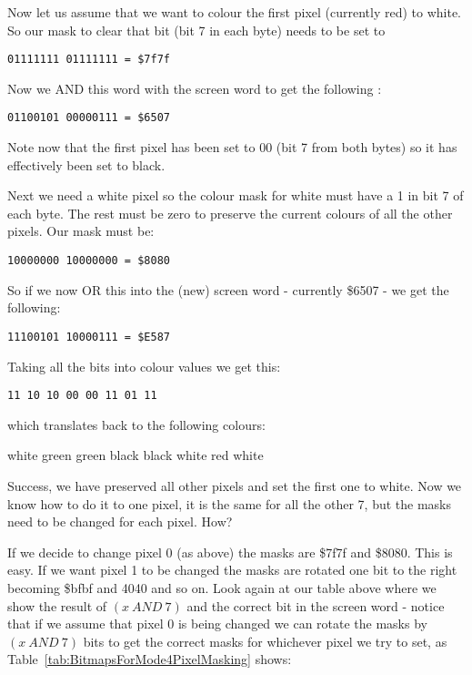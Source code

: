 Now let us assume that we want to colour the first pixel (currently
    red) to white. So our mask to clear that bit (bit 7 in each byte) needs to
    be set to

\begin{lstlisting}[firstnumber=1,frame=none,numbers=none]
01111111 01111111 = $7f7f
\end{lstlisting}

Now we AND this word with the screen word to get the following
   :

\begin{lstlisting}[firstnumber=1,frame=none,numbers=none]
01100101 00000111 = $6507
\end{lstlisting}

Note now that the first pixel has been set to 00 (bit 7 from both
    bytes) so it has effectively been set to black.

Next we need a white pixel so the colour mask for white must have a
    1 in bit 7 of each byte. The rest must be zero to preserve the current
    colours of all the other pixels. Our mask must be:

\begin{lstlisting}[firstnumber=1,frame=none,numbers=none]
10000000 10000000 = $8080
\end{lstlisting}

So if we now OR this into the (new) screen word -{} currently \$6507 -{}
    we get the following:

\begin{lstlisting}[firstnumber=1,frame=none,numbers=none]
11100101 10000111 = $E587
\end{lstlisting}

Taking all the bits into colour values we get this:

\begin{lstlisting}[firstnumber=1,frame=none,numbers=none]
11 10 10 00 00 11 01 11
\end{lstlisting}

which translates back to the following colours:

white green green black black white red white

Success, we have preserved all other pixels and set the first one to
    white. Now we know how to do it to one pixel, it is the same for all the
    other 7, but the masks need to be changed for each pixel. How?

If we decide to change pixel 0 (as above) the masks are \$7f7f and
    \$8080. This is easy. If we want pixel 1 to be changed the masks are
    rotated one bit to the right becoming \$bfbf and 4040 and so on. Look again
    at our table above where we show the result of $(x~AND~7)$ and the correct
    bit in the screen word -{} notice that if we assume that pixel 0 is being
    changed we can rotate the masks by $(x~AND~7)$ bits to get the correct masks
    for whichever pixel we try to set, as Table~\ref{tab:BitmapsForMode4PixelMasking} shows:

